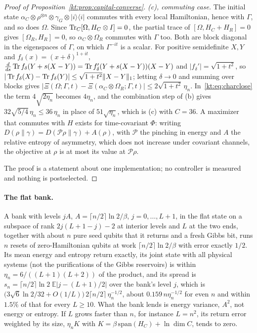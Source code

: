 \begin{proof}[Proof of Proposition~\ref{kt:prop:capital-converse}]
\emph{(c), commuting case.} The initial state $\alpha_C\otimes\rho^{\otimes n}\otimes\gamma_G\otimes|i\rangle\langle i|$ commutes with every local Hamiltonian, hence with $\Gamma$, and so does $\Omega$. Since $\operatorname{Tr}_C[\Omega,H_C\otimes I]=0$, the partial trace of $[\Omega,H_C+H_R]=0$ gives $[\Omega_R,H_R]=0$, so $\alpha_C\otimes\Omega_R$ commutes with $\Gamma$ too. Both are block diagonal in the eigenspaces of $\Gamma$, on which $\Gamma^{-it}$ is a scalar. For positive semidefinite $X,Y$ and $f_\delta(x)=(x+\delta)^{1+it}$, $\frac{d}{ds}\operatorname{Tr} f_\delta(Y+s(X-Y))=\operatorname{Tr} f_\delta'(Y+s(X-Y))(X-Y)$ and $|f_\delta'|=\sqrt{1+t^2}$, so $|\operatorname{Tr} f_\delta(X)-\operatorname{Tr} f_\delta(Y)|\le\sqrt{1+t^2}\|X-Y\|_1$; letting $\delta\to0$ and summing over blocks gives $|\Xi(\Omega;\Gamma,t)-\Xi(\alpha_C\otimes\Omega_R;\Gamma,t)|\le2\sqrt{1+t^2}\,\eta_n$. In~\eqref{kt:eq:charclose} the term $4\sqrt{2\eta_n}$ becomes $4\eta_n$, and the combination step of (b) gives $32\sqrt{5/4}\,\eta_n\le36\,\eta_n$ in place of $51\sqrt{\eta_n}$, which is (c) with $C=36$. A maximizer that commutes with $H$ exists for time-covariant $\Phi$: writing $D(\rho\|\gamma)=D(\mathcal P\rho\|\gamma)+A(\rho)$, with $\mathcal P$ the pinching in energy and $A$ the relative entropy of asymmetry, which does not increase under covariant channels, the objective at $\rho$ is at most its value at $\mathcal P\rho$.

The proof is a statement about one implementation; no controller is measured and nothing is postselected.
\end{proof}

\paragraph{The flat bank.} A bank with levels $jA$, $A=\lceil n/2\rceil\ln2/\beta$, $j=0,\dots,L+1$, in the flat state on a subspace of rank $2j(L+1-j)-2$ at interior levels and $L$ at the two ends, together with about $n$ pure seed qubits that it returns and a fresh Gibbs bit, runs $n$ resets of zero-Hamiltonian qubits at work $\lceil n/2\rceil\ln2/\beta$ with error exactly $1/2$. Its mean energy and entropy return exactly, its joint state with all physical systems (not the purifications of the Gibbs reservoirs) is within $\eta_n=6/((L+1)(L+2))$ of the product, and its spread is $s_n=\lceil n/2\rceil\ln2\;\mathbb E|j-(L+1)/2|$ over the bank's level $j$, which is $\bigl(3\sqrt6\ln2/32+O(1/L)\bigr)\,2\lceil n/2\rceil\,\eta_n^{-1/2}$, about $0.159\,n\eta_n^{-1/2}$ for even $n$ and within $1.5\%$ of that for every $L\ge10$. What the bank lends is energy variance, $A^2$, not energy or entropy. If $L$ grows faster than $n$, for instance $L=n^2$, its return error weighted by its size, $\eta_nK$ with $K=\beta\,\mathrm{span}(H_C)+\ln\dim C$, tends to zero.

